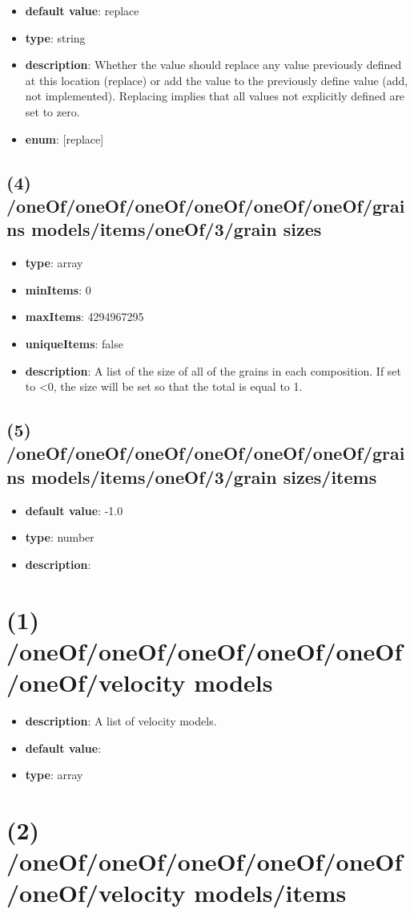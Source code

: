 \begin{itemize}[leftmargin=4em]\item {\bf default value}: replace
\item {\bf type}: string
\item {\bf description}: Whether the value should replace any value previously defined at this location (replace) or add the value to the previously define value (add, not implemented). Replacing implies that all values not explicitly defined are set to zero.
\item {\bf enum}: [replace]\end{itemize}\subsection{(4) /oneOf/oneOf/oneOf/oneOf/oneOf/oneOf/grains models/items/oneOf/3/grain sizes}
\begin{itemize}[leftmargin=4em]\item {\bf type}: array
\item {\bf minItems}: 0
\item {\bf maxItems}: 4294967295
\item {\bf uniqueItems}: false
\item {\bf description}: A list of the size of all of the grains in each composition. If set to <0, the size will be set so that the total is equal to 1.
\end{itemize}\subsection{(5) /oneOf/oneOf/oneOf/oneOf/oneOf/oneOf/grains models/items/oneOf/3/grain sizes/items}
\begin{itemize}[leftmargin=5em]\item {\bf default value}: -1.0
\item {\bf type}: number
\item {\bf description}: 
\end{itemize}\section{(1) /oneOf/oneOf/oneOf/oneOf/oneOf/oneOf/velocity models}
\begin{itemize}[leftmargin=1em]\item {\bf description}: A list of velocity models.
\item {\bf default value}: 
\item {\bf type}: array
\end{itemize}\section{(2) /oneOf/oneOf/oneOf/oneOf/oneOf/oneOf/velocity models/items}

